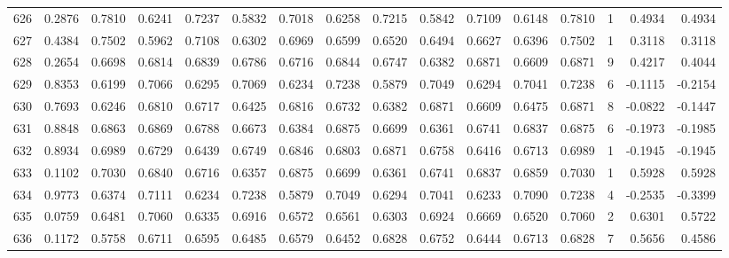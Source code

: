 \begin{tabular}{lrrrrrrrrrrrrrrr}
626 &      0.2876 &  0.7810 &  0.6241 &  0.7237 &  0.5832 &  0.7018 &  0.6258 &  0.7215 &  0.5842 &  0.7109 &   0.6148 &     0.7810 &      1 &                    0.4934 &                     0.4934 \\
627 &      0.4384 &  0.7502 &  0.5962 &  0.7108 &  0.6302 &  0.6969 &  0.6599 &  0.6520 &  0.6494 &  0.6627 &   0.6396 &     0.7502 &      1 &                    0.3118 &                     0.3118 \\
628 &      0.2654 &  0.6698 &  0.6814 &  0.6839 &  0.6786 &  0.6716 &  0.6844 &  0.6747 &  0.6382 &  0.6871 &   0.6609 &     0.6871 &      9 &                    0.4217 &                     0.4044 \\
629 &      0.8353 &  0.6199 &  0.7066 &  0.6295 &  0.7069 &  0.6234 &  0.7238 &  0.5879 &  0.7049 &  0.6294 &   0.7041 &     0.7238 &      6 &                   -0.1115 &                    -0.2154 \\
630 &      0.7693 &  0.6246 &  0.6810 &  0.6717 &  0.6425 &  0.6816 &  0.6732 &  0.6382 &  0.6871 &  0.6609 &   0.6475 &     0.6871 &      8 &                   -0.0822 &                    -0.1447 \\
631 &      0.8848 &  0.6863 &  0.6869 &  0.6788 &  0.6673 &  0.6384 &  0.6875 &  0.6699 &  0.6361 &  0.6741 &   0.6837 &     0.6875 &      6 &                   -0.1973 &                    -0.1985 \\
632 &      0.8934 &  0.6989 &  0.6729 &  0.6439 &  0.6749 &  0.6846 &  0.6803 &  0.6871 &  0.6758 &  0.6416 &   0.6713 &     0.6989 &      1 &                   -0.1945 &                    -0.1945 \\
633 &      0.1102 &  0.7030 &  0.6840 &  0.6716 &  0.6357 &  0.6875 &  0.6699 &  0.6361 &  0.6741 &  0.6837 &   0.6859 &     0.7030 &      1 &                    0.5928 &                     0.5928 \\
634 &      0.9773 &  0.6374 &  0.7111 &  0.6234 &  0.7238 &  0.5879 &  0.7049 &  0.6294 &  0.7041 &  0.6233 &   0.7090 &     0.7238 &      4 &                   -0.2535 &                    -0.3399 \\
635 &      0.0759 &  0.6481 &  0.7060 &  0.6335 &  0.6916 &  0.6572 &  0.6561 &  0.6303 &  0.6924 &  0.6669 &   0.6520 &     0.7060 &      2 &                    0.6301 &                     0.5722 \\
636 &      0.1172 &  0.5758 &  0.6711 &  0.6595 &  0.6485 &  0.6579 &  0.6452 &  0.6828 &  0.6752 &  0.6444 &   0.6713 &     0.6828 &      7 &                    0.5656 &                     0.4586 \\

\end{tabular}
